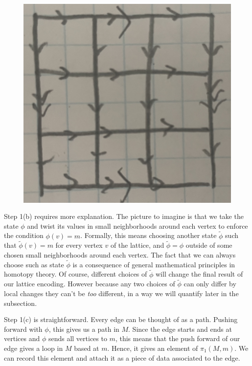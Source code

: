 \documentclass{article}
\theoremstyle{definition}
\numberwithin{figure}{section}
\begin{document}
\begin{figure}[h]
\begin{center}
\includegraphics[scale=.04]{torus-lattice}
\end{center}
\end{figure}

Step 1(b) requires more explanation. The picture to imagine is that we take the state $\phi$ and twist its values in small neighborhoods around each vertex to enforce the condition $\phi(v)=m$. Formally, this means choosing another state $\tilde{\phi}$ such that $\tilde{\phi}(v)=m$ for every vertex $v$ of the lattice, and $\tilde{\phi}=\phi$ outside of some chosen small neighborhoods around each vertex. The fact that we can always choose such as state $\tilde{\phi}$ is a consequence of general mathematical principles in homotopy theory. Of course, different choices of $\tilde{\phi}$ will change the final result of our lattice encoding. However because any two choices of $\tilde{\phi}$ can only differ by local changes they can't be \textit{too} different, in a way we will quantify later in the subsection.

Step 1(c) is straightforward. Every edge can be thought of as a path. Pushing forward with $\phi$, this gives us a path in $M$. Since the edge starts and ends at vertices and $\phi$ sends all vertices to $m$, this means that the push forward of our edge gives a loop in $M$ based at $m$. Hence, it gives an element of $\pi_1(M,m)$. We can record this element and attach it as a piece of data associated to the edge.
\end{document}
